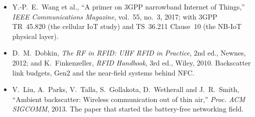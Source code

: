 \begin{itemize}
{Regional Parameters}.
\item Y.-P.~E.~Wang et al., ``A primer on 3GPP narrowband Internet of Things,'' \emph{IEEE
Communications Magazine}, vol.~55, no.~3, 2017; with 3GPP TR~45.820 (the cellular IoT study) and
TS~36.211 Clause~10 (the NB-IoT physical layer).
\item D.~M.~Dobkin, \emph{The RF in RFID: UHF RFID in Practice}, 2nd ed., Newnes, 2012; and
K.~Finkenzeller, \emph{RFID Handbook}, 3rd ed., Wiley, 2010. Backscatter link budgets, Gen2 and the
near-field systems behind NFC.
\item V.~Liu, A.~Parks, V.~Talla, S.~Gollakota, D.~Wetherall and J.~R.~Smith, ``Ambient backscatter:
Wireless communication out of thin air,'' \emph{Proc. ACM SIGCOMM}, 2013. The paper that started the
battery-free networking field.
\end{itemize}
